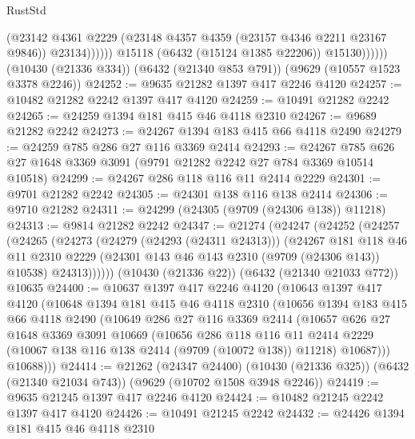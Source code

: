 \begin{lexlean}{RustStd}
\begin{coremodule}
                          (@23142
                            @4361
                            @2229
                            (@23148 @4357 @4359 (@23157 @4346 @2211 @23167 @9846))
                            @23134))))))
                @15118
                (@6432 (@15124 @1385 @22206))
                @15130))))))
    (@10430 (@21336 @334))
    (@6432 (@21340 @853 @791))
    (@9629 (@10557 @1523 @3378 @2246))
@24252 := @9635 @21282 @1397 @417 @2246 @4120
@24257 := @10482 @21282 @2242 @1397 @417 @4120
@24259 := @10491 @21282 @2242
@24265 := @24259 @1394 @181 @415 @46 @4118 @2310
@24267 := @9689 @21282 @2242
@24273 := @24267 @1394 @183 @415 @66 @4118 @2490
@24279 := @24259 @785 @286 @27 @116 @3369 @2414
@24293 := @24267 @785 @626 @27 @1648 @3369 @3091 (@9791 @21282 @2242 @27 @784 @3369 @10514 @10518)
@24299 := @24267 @286 @118 @116 @11 @2414 @2229
@24301 := @9701 @21282 @2242
@24305 := @24301 @138 @116 @138 @2414
@24306 := @9710 @21282
@24311 := @24299 (@24305 (@9709 (@24306 @138)) @11218)
@24313 := @9814 @21282 @2242
@24347 := @21274
    (@24247
      (@24252
        (@24257
          (@24265
            (@24273
              (@24279 (@24293 (@24311 @24313)))
              (@24267
                @181
                @118
                @46
                @11
                @2310
                @2229
                (@24301 @143 @46 @143 @2310 (@9709 (@24306 @143)) @10538)
                @24313))))))
    (@10430 (@21336 @22))
    (@6432 (@21340 @21033 @772))
    @10635
@24400 := @10637
    @1397
    @417
    @2246
    @4120
    (@10643
      @1397
      @417
      @4120
      (@10648
        @1394
        @181
        @415
        @46
        @4118
        @2310
        (@10656
          @1394
          @183
          @415
          @66
          @4118
          @2490
          (@10649
            @286
            @27
            @116
            @3369
            @2414
            (@10657
              @626
              @27
              @1648
              @3369
              @3091
              @10669
              (@10656
                @286
                @118
                @116
                @11
                @2414
                @2229
                (@10067 @138 @116 @138 @2414 (@9709 (@10072 @138)) @11218)
                @10687)))
          @10688)))
@24414 := @21262
    (@24347 @24400)
    (@10430 (@21336 @325))
    (@6432 (@21340 @21034 @743))
    (@9629 (@10702 @1508 @3948 @2246))
@24419 := @9635 @21245 @1397 @417 @2246 @4120
@24424 := @10482 @21245 @2242 @1397 @417 @4120
@24426 := @10491 @21245 @2242
@24432 := @24426 @1394 @181 @415 @46 @4118 @2310

\end{coremodule}
\end{lexlean}
